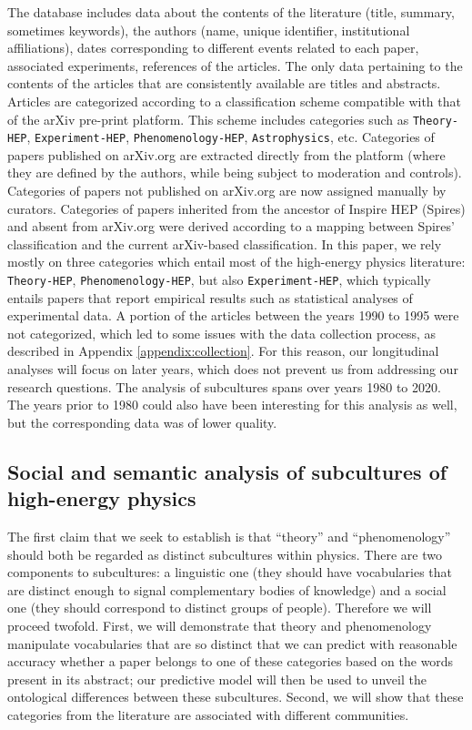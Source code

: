 \documentclass[smallextended]{svjour3}
\begin{document}
The database includes data about the contents of the literature (title, summary, sometimes keywords), the authors (name, unique identifier, institutional affiliations), dates corresponding to different events related to each paper, associated experiments, references of the articles. The only data pertaining to the contents of the articles that are consistently available are titles and abstracts. Articles are categorized according to a classification scheme compatible with that of the arXiv pre-print platform. This scheme includes categories such as \texttt{Theory-HEP}, \texttt{Experiment-HEP}, \texttt{Phenomenology-HEP}, \texttt{Astrophysics}, etc. Categories of papers published on arXiv.org are extracted directly from the platform (where they are defined by the authors, while being subject  to moderation and controls). Categories of papers not published on arXiv.org are now assigned manually by curators. Categories of papers inherited from the ancestor of Inspire HEP (Spires) and absent from arXiv.org were derived according to a mapping between Spires' classification and the current arXiv-based classification. In this paper, we rely mostly on three categories which entail most of the high-energy physics literature: \texttt{Theory-HEP}, \texttt{Phenomenology-HEP}, but also \texttt{Experiment-HEP}, which typically entails papers that report empirical results such as statistical analyses of experimental data. A portion of the articles between the years 1990 to 1995 were not categorized, which led to some issues with the data collection process, as described in Appendix \ref{appendix:collection}. For this reason, our longitudinal analyses will focus on later years, which does not prevent us from addressing our research questions. The analysis of subcultures spans over years 1980 to 2020. The years prior to 1980 could also have been interesting for this analysis as well, but the corresponding data was of lower quality.


\subsection{Social and semantic analysis of subcultures of high-energy physics}\label{section:method_subcultures}

The first claim that we seek to establish is that ``theory'' and ``phenomenology'' should both be regarded as distinct subcultures within physics. There are two components to subcultures: a linguistic one (they should have vocabularies that are distinct enough to signal complementary bodies of knowledge) and a social one (they should correspond to distinct groups of people). Therefore we will proceed twofold. First, we will demonstrate that theory and phenomenology manipulate vocabularies that are so distinct that we can predict with reasonable accuracy whether a paper belongs to one of these categories based on the words present in its abstract; our predictive model will then be used to unveil the ontological differences between these subcultures. Second, we will show that these categories from the literature are associated with different communities.
\end{document}
